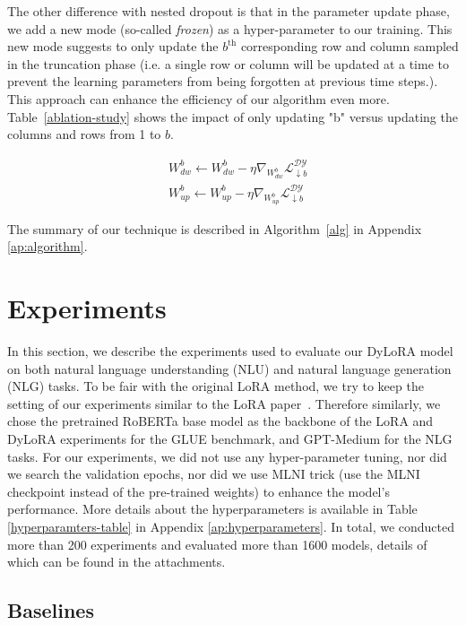 The other difference with nested dropout is that in the parameter update phase, we add a new mode (so-called \textit{frozen}) as a hyper-parameter to our training. This new mode suggests to only update the $b^\text{th}$ corresponding row and column sampled in the truncation phase (i.e. a single row or column will be updated at a time to prevent the learning parameters from being forgotten at previous time steps.). This approach can enhance the efficiency of our algorithm even more. Table~\ref{ablation-study} shows the impact of only updating "b" versus updating the columns and rows from 1 to $b$.

\begin{equation}
\begin{split}
  &  W_{dw}^b  \leftarrow W_{dw}^b - \eta \nabla_{W_{dw}^b} \mathcal{L}_{\downarrow b}^{\mathcal{DY}} \\
  &  W_{up}^b  \leftarrow W_{up}^b - \eta \nabla_{W_{up}^b} \mathcal{L}_{\downarrow b}^{\mathcal{DY}} 
  \end{split}
\end{equation}

The summary of our technique is described in Algorithm~\ref{alg} in Appendix \ref{ap:algorithm}.

\section{Experiments}

In this section, we describe the experiments used to evaluate our DyLoRA model on both natural language understanding (NLU) and natural language generation (NLG) tasks. To be fair with the original LoRA method, we try to keep the setting of our experiments similar to the LoRA paper~\cite{hu2021lora}. Therefore similarly, we chose the pretrained RoBERTa \cite{liu2019roberta} base model as the backbone of the LoRA and DyLoRA experiments for the GLUE benchmark, and GPT-Medium for the NLG tasks. For our experiments, we did not use any hyper-parameter tuning, nor did we search the validation epochs, nor did we use MLNI trick (use the MLNI checkpoint instead of the pre-trained weights) to enhance the model's performance. More details about the hyperparameters is available in Table \ref{hyperparamters-table} in Appendix \ref{ap:hyperparameters}. In total, we conducted more than 200 experiments and evaluated more than 1600 models, details of which can be found in the attachments.

\subsection{Baselines}


